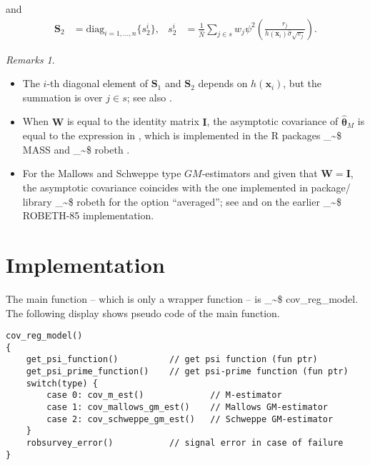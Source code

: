 \documentclass[a4paper,oneside,11pt,DIV=12]{scrartcl}
\makeatletter
\theoremstyle{remark}
\newtheorem*{rems}{Remarks}
\newcommand\code{\bgroup\@makeother\_\@makeother\~\@makeother\$\@makeother\^\@codex}
\def\@codex#1{{\normalfont\ttfamily\hyphenchar\font=-1 #1}\egroup}
\makeatother
\begin{document}
\noindent and
\begin{align*}
    \bm S_2 &= \mathrm{diag}_{i=1,\ldots,n} \big\{ s_2^i \big\},
    & s_2^i &= \frac{1}{\widehat{N}}\sum_{j \in s} w_j
    \psi^2\left(\frac{r_j}{h(\bm x_i)\widehat{\sigma} \sqrt{v_j}}\right).
\end{align*}

\begin{rems}~
    \begin{itemize}
        \item The $i$-th diagonal element of $\bm S_1$ and $\bm S_2$ depends on
            $h(\bm x_i)$, but the summation is over $j \in s$; see also
            \citep[][Chapter 6]{marazzi_1987}.
        \item When $\bm W$ is equal to the identity matrix $\bm I$, the
            asymptotic covariance of $\widehat{\bm{\theta}}_M$ is equal to the
            expression in \citet[][Eq. 6.5]{huber_1981}, which is implemented
            in the R packages \code{MASS} \citep{venables_ripley_2002} and
            \code{robeth} \citep{marazzi_2020}.
        \item For the Mallows and Schweppe type $GM$-estimators and given that
            $\bm W = \bm I$, the asymptotic covariance coincides with the one
            implemented in package/ library \code{robeth} for the option
            ``averaged''; see \citet[][Chapter 4]{marazzi_1993} and
            \citet[][Chapter 2.6]{marazzi_1987} on the earlier \code{ROBETH-85}
            implementation.
    \end{itemize}
\end{rems}
\section{Implementation}
The main function -- which is only a wrapper function -- is
\code{cov_reg_model}. The following display shows  pseudo code of the main
function.

\begin{verbatim}
cov_reg_model()
{
    get_psi_function()          // get psi function (fun ptr)
    get_psi_prime_function()    // get psi-prime function (fun ptr)
    switch(type) {
        case 0: cov_m_est()             // M-estimator
        case 1: cov_mallows_gm_est()    // Mallows GM-estimator
        case 2: cov_schweppe_gm_est()   // Schweppe GM-estimator
    }
    robsurvey_error()           // signal error in case of failure
}
\end{verbatim}
\end{document}
